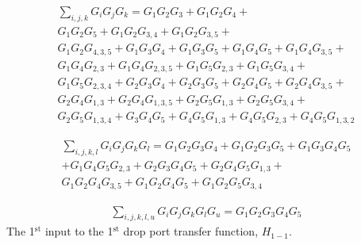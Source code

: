 \documentclass{osa-article}
\begin{document}
\begin{equation}
\begin{split}
\sum_{i,j,k} {G_i G_j G_k}=G_1G_2G_3+G_1G_2G_4+\\G_1G_2G_5+G_1G_2G_{3,4}+G_1G_2G_{3,5}+\\G_1G_2G_{4,3,5}+G_1G_3G_4+G_1G_3G_5+G_1G_4G_5+G_1G_4G_{3,5}+\\G_1G_4G_{2,3}+G_1G_4G_{2,3,5}+G_1G_5G_{2,3}+G_1G_5G_{3,4}+\\G_1G_5G_{2,3,4}+G_2G_3G_4+G_2G_3G_5+G_2G_4G_5+G_2G_4G_{3,5}+\\G_2G_4G_{1,3}+G_2G_4G_{1,3,5}+G_2G_5G_{1,3}+G_2G_5G_{3,4}+\\G_2G_5G_{1,3,4}+G_3G_4G_5+G_4G_5G_{1,3}+G_4G_5G_{2,3}+G_4G_5G_{1,3,2} 
\label{eqa44}
\end{split}
\end{equation}

\begin{equation}
\begin{split}
\sum_{i,j,k,l} {G_i G_j G_kG_l}=G_1G_2G_3G_4+G_1G_2G_3G_5+G_1G_3G_4G_5\\
+G_1G_4G_5G_{2,3}+G_2G_3G_4G_5+G_2G_4G_5G_{1,3}+\\
G_1G_2G_4G_{3,5}+G_1G_2G_4G_5+G_1G_2G_5G_{3,4}
\label{eqa45}
\end{split}
\end{equation}

\begin{equation}
\begin{split}
\sum_{i,j,k,l,u} {G_i G_j G_kG_lG_u}=G_1G_2G_3G_4G_5 
\label{eqa46}
\end{split}
\end{equation}
The 1$^{\text{st}}$ input to the 1$^{\text{st}}$ drop port transfer function, $H_{1-1}$.\\
\end{document}
